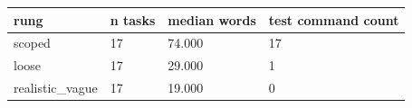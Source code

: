 \begin{tabular}{llll}
\toprule
rung & n tasks & median words & test command count \\
\midrule
scoped & 17 & 74.000 & 17 \\
loose & 17 & 29.000 & 1 \\
realistic\_vague & 17 & 19.000 & 0 \\
\bottomrule
\end{tabular}
